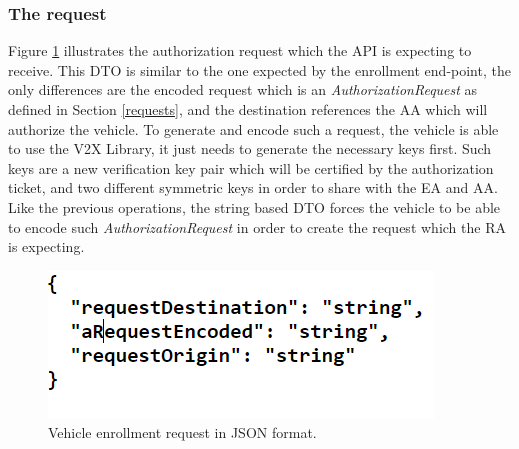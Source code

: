 \subsubsection{The request}
Figure \ref{fig:auth_req} illustrates the authorization request which the API is expecting to receive. This DTO is similar to the one expected by the enrollment end-point, the only differences are the encoded request which is an \textit{AuthorizationRequest} as defined in Section \ref{requests}, and the destination references the AA which will authorize the vehicle. To generate and encode such a request, the vehicle is able to use the V2X Library, it just needs to generate the necessary keys first. Such keys are a new verification key pair which will be certified by the authorization ticket, and two different symmetric keys in order to share with the EA and AA. Like the previous operations, the string based DTO forces the vehicle to be able to encode such \textit{AuthorizationRequest} in order to create the request which the RA is expecting.

\begin{figure}
	\centering
	\includegraphics[width=0.5
	\textwidth]{Figures/auth_req}
	\caption{\label{fig:auth_req}Vehicle enrollment request in JSON format.}
\end{figure}

